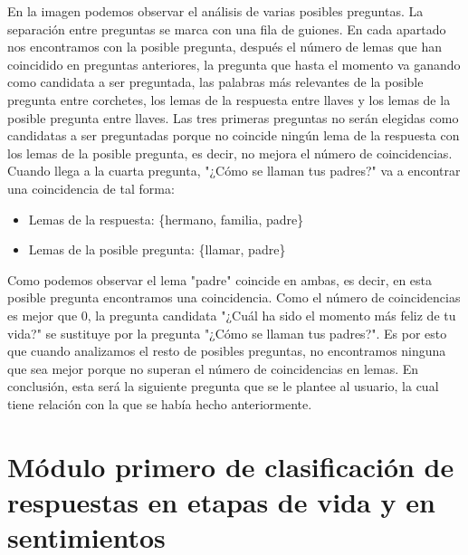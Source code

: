En la imagen podemos observar el análisis de varias posibles preguntas. La separación entre preguntas se marca con una fila de guiones. En cada apartado nos encontramos con la posible pregunta, después el número de lemas que han coincidido en preguntas anteriores, la pregunta que hasta el momento va ganando como candidata a ser preguntada, las palabras más relevantes de la posible pregunta entre corchetes, los lemas de la respuesta entre llaves y los lemas de la posible pregunta entre llaves. Las tres primeras preguntas no serán elegidas como candidatas a ser preguntadas porque no coincide ningún lema de la respuesta con los lemas de la posible pregunta, es decir, no mejora el número de coincidencias. Cuando llega a la cuarta pregunta, "¿Cómo se llaman tus padres?" va a encontrar una coincidencia de tal forma:

\begin{itemize}
	\item[] Lemas de la respuesta: \hspace{2cm} \{hermano, familia, padre\} 
	\item[] Lemas de la posible pregunta: \hspace{0.8cm} \{llamar, padre\}
\end{itemize}

Como podemos observar el lema "padre" coincide en ambas, es decir, en esta posible pregunta encontramos una coincidencia. Como el número de coincidencias es mejor que 0, la pregunta candidata "¿Cuál ha sido el momento más feliz de tu vida?" se sustituye por la pregunta "¿Cómo se llaman tus padres?". Es por esto que cuando analizamos el resto de posibles preguntas, no encontramos ninguna que sea mejor porque no superan el número de coincidencias en lemas. En conclusión, esta será la siguiente pregunta que se le plantee al usuario, la cual tiene relación con la que se había hecho anteriormente. 

\section{Módulo primero de clasificación de respuestas en etapas de vida y en sentimientos}




